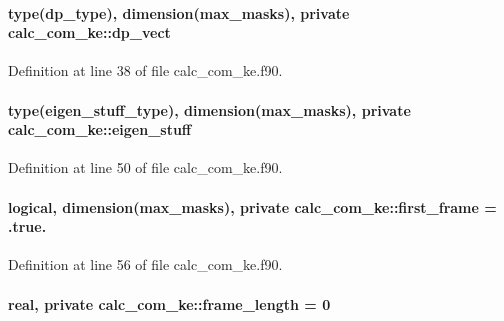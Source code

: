\hypertarget{classcalc__com__ke_aa5cda373aecf567fcffcdb4103785cdc}{
\paragraph[{dp\-\_\-vect}]{\setlength{\rightskip}{0pt plus 5cm}type({\bf dp\-\_\-type}), dimension({\bf max\-\_\-masks}), private calc\-\_\-com\-\_\-ke\-::dp\-\_\-vect\hspace{0.3cm}{\ttfamily [private]}}}\label{classcalc__com__ke_aa5cda373aecf567fcffcdb4103785cdc}


Definition at line 38 of file calc\-\_\-com\-\_\-ke.\-f90.

\hypertarget{classcalc__com__ke_a5cfdb84100f1ab18b77834edb7640dfd}{
\paragraph[{eigen\-\_\-stuff}]{\setlength{\rightskip}{0pt plus 5cm}type({\bf eigen\-\_\-stuff\-\_\-type}), dimension({\bf max\-\_\-masks}), private calc\-\_\-com\-\_\-ke\-::eigen\-\_\-stuff\hspace{0.3cm}{\ttfamily [private]}}}\label{classcalc__com__ke_a5cfdb84100f1ab18b77834edb7640dfd}


Definition at line 50 of file calc\-\_\-com\-\_\-ke.\-f90.

\hypertarget{classcalc__com__ke_aaa14f98bd5343cc4fbdb740b7a6936b2}{
\paragraph[{first\-\_\-frame}]{\setlength{\rightskip}{0pt plus 5cm}logical, dimension({\bf max\-\_\-masks}), private calc\-\_\-com\-\_\-ke\-::first\-\_\-frame = .true.\hspace{0.3cm}{\ttfamily [private]}}}\label{classcalc__com__ke_aaa14f98bd5343cc4fbdb740b7a6936b2}


Definition at line 56 of file calc\-\_\-com\-\_\-ke.\-f90.

\hypertarget{classcalc__com__ke_a2d596d2857cde02b13a7f4626d66c877}{
\paragraph[{frame\-\_\-length}]{\setlength{\rightskip}{0pt plus 5cm}real, private calc\-\_\-com\-\_\-ke\-::frame\-\_\-length = 0\hspace{0.3cm}{\ttfamily [private]}}}\label{classcalc__com__ke_a2d596d2857cde02b13a7f4626d66c877}


